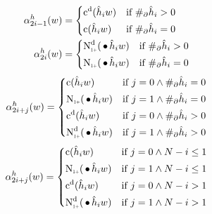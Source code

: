 \begin{subequations}
  \begin{align}
    \SumArg_{2 i - 1}^h(w) &=
      \begin{dcases*}
        \DiscountedCount(\DerivedHistory[i] w)        & if $\NumSkpOp{\DerivedHistory[i]} > 0$ \\
        \Count(\DerivedHistory[i] w)                  & if $\NumSkpOp{\DerivedHistory[i]} = 0$
      \end{dcases*} \\
    \SumArg_{2 i}^h(w) &=
      \begin{dcases*}
        \DiscountedCount*(\WSkp \DerivedHistory[i] w) & if $\NumSkpOp{\DerivedHistory[i]} > 0$ \\
        \ContCountIp(\WSkp \DerivedHistory[i] w)      & if $\NumSkpOp{\DerivedHistory[i]} = 0$
      \end{dcases*}
  \end{align}
\end{subequations}
\begin{equation}
  \SumArg_{2 i + j}^h(w) =
    \begin{dcases*}
      \Count(\DerivedHistory[i] w)                  & if $j = 0 \land \NumSkpOp{\DerivedHistory[i]} = 0$ \\
      \ContCountIp(\WSkp \DerivedHistory[i] w)      & if $j = 1 \land \NumSkpOp{\DerivedHistory[i]} = 0$ \\
      \DiscountedCount(\DerivedHistory[i] w)        & if $j = 0 \land \NumSkpOp{\DerivedHistory[i]} > 0$ \\
      \DiscountedCount*(\WSkp \DerivedHistory[i] w) & if $j = 1 \land \NumSkpOp{\DerivedHistory[i]} > 0$
    \end{dcases*}
\end{equation}
\begin{equation}
  \SumArg_{2 i + j}^h(w) =
    \begin{dcases*}
      \Count(\DerivedHistory[i] w)                  & if $j = 0 \land N - i \leq 1$ \\
      \ContCountIp(\WSkp \DerivedHistory[i] w)      & if $j = 1 \land N - i \leq 1$ \\
      \DiscountedCount(\DerivedHistory[i] w)        & if $j = 0 \land N - i > 1$ \\
      \DiscountedCount*(\WSkp \DerivedHistory[i] w) & if $j = 1 \land N - i > 1$
    \end{dcases*}
\end{equation}

